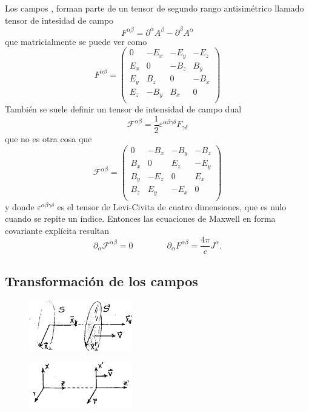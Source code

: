 \documentclass[10pt,oneside]{CBFT_book}
\begin{document}
Los campos ,  forman parte de un tensor de segundo rango antisimétrico llamado tensor
de intesidad de campo 
\[
	F^{\alpha\beta} = \partial^\alpha A^\beta - \partial^\beta A^\alpha
\]
que matricialmente se puede ver como 
\[
	F^{\alpha\beta} =
	\begin{pmatrix}
	 0 & -E_x & -E_y & -E_z \\
	 E_x & 0 & -B_z & B_y \\
	 E_y & B_z & 0 & -B_x \\
	 E_z & -B_y & B_x & 0 \\
	\end{pmatrix}
\]
También se suele definir un tensor de intensidad de campo dual
\[
	\mathcal{F}^{\alpha\beta} =  \frac{1}{2} \varepsilon^{\alpha\beta\gamma\delta} F_{\gamma\delta}
\]
que no es otra cosa que 
\[
	\mathcal{F}^{\alpha\beta}=
	\begin{pmatrix}
	 0 & -B_x & -B_y & -B_z \\
	 B_x & 0 & E_z & -E_y \\
	 B_y & -E_z & 0 & E_x \\
	 B_z & E_y & -E_x & 0 \\
	\end{pmatrix}
\]
y donde $\varepsilon^{\alpha\beta\gamma\delta}$ es el tensor de Levi-Civita de cuatro dimensiones, que es nulo
cuando se repite un índice.
Entonces las ecuaciones de Maxwell en forma covariante explícita resultan 
\[
	\partial_\alpha \mathcal{F}^{\alpha\beta} =  0 \qquad \qquad 
	\partial_\alpha F^{\alpha\beta} =  \frac{4 \pi}{c} J^\alpha.
\]

\subsection{Transformación de los campos}

\begin{figure}[htb]
	\begin{center}
	\includegraphics[width=0.4\textwidth]{images/fig_ft1_transfCampo1.pdf}	 
	\end{center}
	\caption{}
\end{figure} 

\begin{figure}[htb]
	\begin{center}
	\includegraphics[width=0.4\textwidth]{images/fig_ft1_transfCampo2.pdf}	 
	\end{center}
	\caption{}
\end{figure} 
\end{document}
